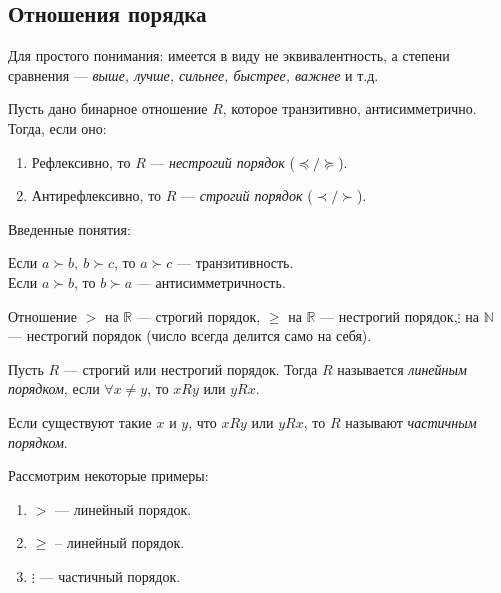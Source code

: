 \documentclass[russian]{lecture-notes}
\begin{document}
	\subsection{Отношения порядка}
	Для простого понимания: имеется в виду не эквивалентность, а степени сравнения --- \textit{выше, лучше, сильнее, быстрее, важнее} и т.д.
	\begin{definition}
		Пусть дано бинарное отношение $R$, которое транзитивно, антисимметрично. Тогда, если оно:
		\begin{enumerate}
			\item Рефлексивно, то $R$ --- \textit{нестрогий порядок} ($\preceq/\succeq$).
			\item Антирефлексивно, то $R$ --- \textit{строгий порядок} ($\prec/\succ$).
		\end{enumerate}
	\end{definition}
	\begin{note}
		Введенные понятия:
		\begin{center}
			Если $a \succ b,~b \succ c$, то $a \succ c$ --- транзитивность.\\
			Если $a \succ b$, то \sout{$b \succ a$} --- антисимметричность.
		\end{center}
	\end{note}
	\begin{example}
		Отношение $>$ на $\mathbb{R}$ --- строгий порядок, $\geq$ на $\mathbb{R}$ --- нестрогий порядок,\linebreak$\vdots$ на $\mathbb{N}$ --- нестрогий порядок (число всегда делится само на себя).
	\end{example}
	\begin{definition}
		Пусть $R$ --- строгий или нестрогий порядок. Тогда $R$ называется \textit{линейным порядком}, если $\forall x \neq y$, то $xRy$ или $yRx$.
		\begin{remark}
			Если существуют такие $x$ и $y$, что \sout{$xRy$} или \sout{$yRx$}, то $R$ называют \textit{частичным порядком}.
		\end{remark}
	\end{definition}
	\begin{example}
		Рассмотрим некоторые примеры:
		\begin{enumerate}
			\item $>$ --- линейный порядок.
			\item $\geq$ -- линейный порядок.
			\item $\vdots$ --- частичный порядок.
		\end{enumerate}
	\end{example}
\end{document}
